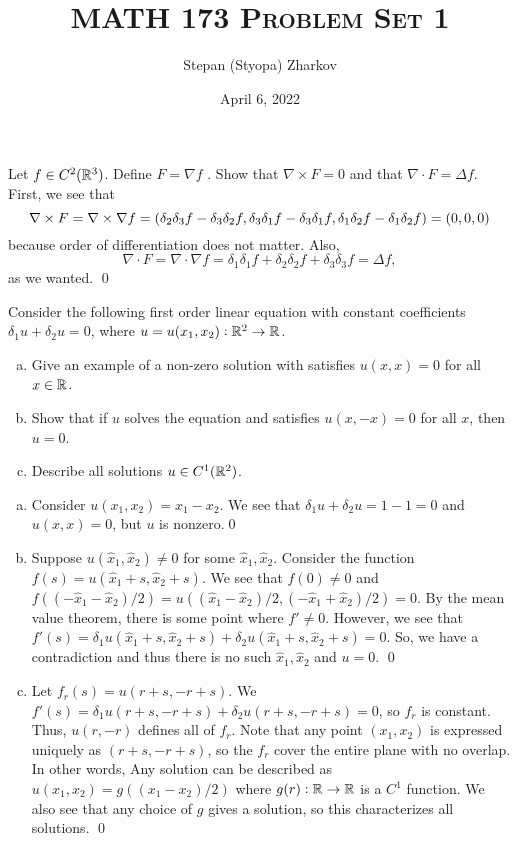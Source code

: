 \documentclass{article}
\title{\textsc{MATH 173 Problem Set 1}}
\author{Stepan (Styopa) Zharkov}
\date{April 6, 2022}
\newcommand{\D}{\nabla}
\renewcommand{\d}{\delta}
\begin{document}
\maketitle
{} Let $f \in C^2(\mathbb{R}^3)$. Define $F = \D f$ . Show that $\D \times F = 0$ and that $\D \cdot F = \Delta f$. \tri
\hop
\solution
First, we see that 
\[\D \times F = \D \times \D f = \del{\d_2\d_3 f - \d_3\d_2 f,\d_3\d_1 f - \d_3\d_1 f, \d_1\d_2 f - \d_1\d_2 f} = (0,0,0)\]
because order of differentiation does not matter. Also, 
\[\D \cdot F = \D \cdot \D f = \d_1\d_1 f +  \d_2\d_2 f  + \d_3\d_3 f  = \Delta f,\]
as we wanted. \qed


\newpage
{}Consider the following first order linear equation with constant coefficients
$\d_1u + \d_2u = 0$, where $u = u(x_1, x_2) : \mathbb{R}^2 \to \mathbb{R}$.
\begin{enumerate}[(a)]
    \item Give an example of a non-zero solution with satisfies $u(x, x) = 0$ for all $x \in \mathbb{R}$.
    \item Show that if $u$ solves the equation and satisfies $u(x, -x) = 0$ for all $x$, then $u = 0$.
    \item Describe all solutions $u \in C^1(\mathbb{R}^2)$.
\end{enumerate}
\tri
\hop
\solution 
\begin{enumerate}[(a)]
    \item Consider $u(x_1, x_2) = x_1 - x_2$. We see that $\d_1u+\d_2u=1-1=0$ and $u(x,x)=0$, but $u$ is nonzero.\qed
    \item Suppose $u(\hat x_1, \hat x_2) \ne 0$ for some $\hat x_1, \hat x_2$. Consider the function $f(s) = u(\hat x_1 + s, \hat x_2 + s)$. We see that $f(0)\ne 0$ and $f((-\hat x_1 -\hat x_2)/2)= u((\hat x_1-\hat x_2)/2, (-\hat x_1+\hat x_2)/2) = 0$. By the mean value theorem, there is some point where $f' \ne 0$. 
    \hop
    However, we see that $f'(s) = \d_1u(\hat x_1+s,\hat x_2+s)+\d_2u(\hat x_1+s, \hat x_2+s) = 0$. So, we have a contradiction and thus there is no such $\hat x_1, \hat x_2$ and $u = 0$. \qed
    \item Let $f_r(s) = u(r+s,-r+s)$. We $f'(s) = \d_1u(r+s,-r+s)+\d_2u(r+s, -r+s) = 0$, so $f_r$ is constant. Thus, $u(r,-r)$ defines all of $f_r$. Note that any point $(x_1, x_2)$ is expressed uniquely as $(r+s, -r+s)$, so the $f_r$ cover the entire plane with no overlap. 
    \hop
    In other words, Any solution can be described as $u(x_1, x_2) = g((x_1-x_2)/2)$ where $g(r): \mathbb{R} \to \mathbb{R}$ is a $C^1$ function. We also see that any choice of $g$ gives a solution, so this characterizes all solutions. \qed
\end{enumerate}
\end{document}
